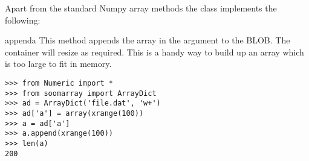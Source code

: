 Apart from the standard Numpy array methods the 
class implements the following:

\begin{methoddesc}[MmapArray]{append}{a}
This method appends the array in the  argument to the BLOB.
The  container will resize as required.  This is a
handy way to build up an array which is too large to fit in memory.

\begin{verbatim}
>>> from Numeric import *
>>> from soomarray import ArrayDict 
>>> ad = ArrayDict('file.dat', 'w+')
>>> ad['a'] = array(xrange(100))
>>> a = ad['a']
>>> a.append(xrange(100))
>>> len(a) 
200
\end{verbatim}
\end{methoddesc}
